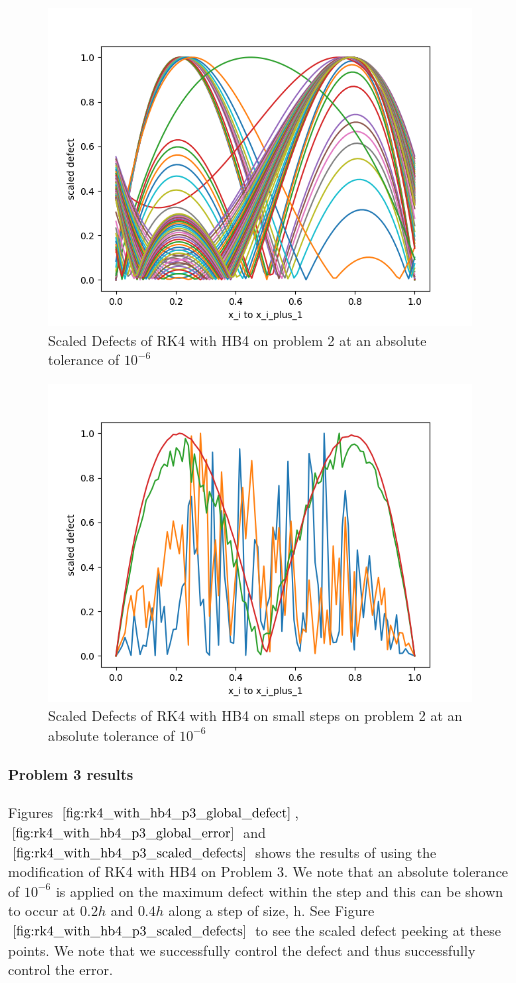 \documentclass{article}
\begin{document}
\begin{figure}[H]
\centering
\includegraphics[width=0.7\linewidth]{./figures/rk4_with_hb4_p2_scaled_defects}
\caption{Scaled Defects of RK4 with HB4 on problem 2 at an absolute tolerance of $10^{-6}$}
\label{fig:rk4_with_hb4_p2_scaled_defects}
\end{figure}

\begin{figure}[H]
\centering
\includegraphics[width=0.7\linewidth]{./figures/rk4_with_hb4_p2_scaled_defects_small_steps}
\caption{Scaled Defects of RK4 with HB4 on small steps on problem 2 at an absolute tolerance of $10^{-6}$}
\label{fig:rk4_with_hb4_p2_scaled_defects_small_steps}
\end{figure}

\paragraph{Problem 3 results}
Figures $\ref{fig:rk4_with_hb4_p3_global_defect}$, $\ref{fig:rk4_with_hb4_p3_global_error}$ and $\ref{fig:rk4_with_hb4_p3_scaled_defects}$ shows the results of using the modification of RK4 with HB4 on Problem 3. We note that an absolute tolerance of $10^{-6}$ is applied on the maximum defect within the step and this can be shown to occur at $0.2h$ and $0.4h$ along a step of size, h. See Figure $\ref{fig:rk4_with_hb4_p3_scaled_defects}$ to see the scaled defect peeking at these points. We note that we successfully control the defect and thus successfully control the error.
\end{document}
